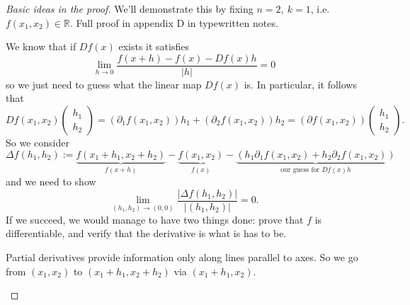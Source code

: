 \documentclass[a4paper]{article}
\theoremstyle{definition}
\begin{document}
\begin{proof}[Basic ideas in the proof] We'll demonstrate this by fixing $n=2,\ k=1$, i.e. $f(x_1,x_2) \in \mathbb R$. Full proof in appendix D in typewritten notes.

We know that if $Df(x)$ exists it satisfies
\[
\lim_{h\rightarrow 0} \frac{f(x+h)-f(x)-Df(x)h}{|h|}=0
\]
so we just need to guess what the linear map $Df(x)$ is. In particular, it follows that
\[
Df(x_1,x_2) \begin{pmatrix}
h_1 \\ h_2
\end{pmatrix} = (\partial_1f(x_1,x_2))h_1+(\partial_2f(x_1,x_2))h_2 = (\partial f(x_1,x_2)) \begin{pmatrix}
h_1 \\ h_2
\end{pmatrix} .
\]
So we consider
\[
\Delta f(h_1,h_2) := \underbrace{f(x_1+h_1,x_2+h_2)}_{f(x+h)}-\underbrace{f(x_1,x_2)}_{f(x)}-\underbrace{\left(h_1\partial_1 f(x_1,x_2)+h_2 \partial_2 f(x_1,x_2)\right)}_{\text{our guess for }Df(x)h}
\]
and we need to show
\[
\lim_{(h_1,h_2)\rightarrow (0,0)} \frac{|\Delta f(h_1,h_2)|}{|(h_1,h_2)|}=0 .
\]
If we succeed, we would manage to have two things done: prove that $f$ is differentiable, and verify that the derivative is what is has to be.

Partial derivatives provide information only along lines parallel to axes. So we go from $(x_1,x_2)$ to $(x_1+h_1,x_2+h_2)$ via $(x_1+h_1,x_2)$.

\begin{center}
\end{center}


\end{proof}
\end{document}
